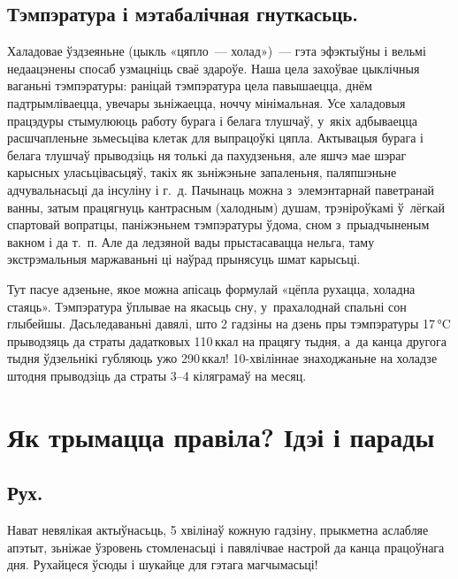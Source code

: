 
\subsection{Тэмпэратура і мэтабалічная гнуткасьць.}
Халадовае ўздзеяньне (цыкль «цяпло~--- холад»)~--- гэта эфэктыўны і вельмі недаацэнены спосаб узмацніць сваё здароўе. Наша цела захоўвае цыклічныя ваганьні тэмпэратуры: раніцай тэмпэратура цела павышаецца, днём падтрымліваецца, увечары зьніжаецца, ноччу мінімальная. Усе халадовыя працэдуры стымулююць работу бурага і белага тлушчаў, у~якіх адбываецца расшчапленьне зьмесьціва клетак для выпрацоўкі цяпла. Актывацыя бурага і белага тлушчаў прыводзіць ня толькі да пахудзеньня, але яшчэ мае шэраг карысных уласьцівасьцяў, такіх як зьніжэньне запаленьня, паляпшэньне адчувальнасьці да інсуліну і г.~д. Пачынаць можна з~элемэнтарнай паветранай ванны, затым працягнуць кантрасным (халодным) душам, трэніроўкамі ў~лёгкай спартовай вопратцы, паніжэньнем тэмпэратуры ўдома, сном з~прыадчыненым вакном і да т.~п. Але да ледзяной вады прыстасавацца нельга, таму экстрэмальныя маржаваньні ці наўрад прынясуць шмат карысьці.

Тут пасуе адзеньне, якое можна апісаць формулай «цёпла рухацца, холадна стаяць». Тэмпэратура ўплывае на якасьць сну, у~прахалоднай спальні сон глыбейшы. Дасьледаваньні давялі, што 2 гадзіны на дзень пры тэмпэратуры 17\,°C прыводзяць да страты дадатковых 110\,ккал на працягу тыдня, а~да канца другога тыдня ўдзельнікі губляюць ужо 290\,ккал! 10-хвіліннае знаходжаньне на холадзе штодня прыводзіць да страты 3--4 кіляграмаў на месяц.

\section{Як трымацца правіла? Ідэі і парады}

\subsection{Рух.}
Нават невялікая актыўнасьць, 5 хвілінаў кожную гадзіну, прыкметна аслабляе апэтыт, зьніжае ўзровень стомленасьці і павялічвае настрой да канца працоўнага дня. Рухайцеся ўсюды і шукайце для гэтага магчымасьці!

